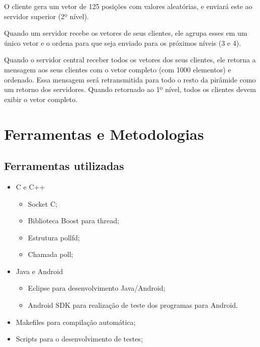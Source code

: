 \documentclass[12pt,a4paper]{article}
\begin{document}
	O cliente gera um vetor de 125 posições com valores aleatórias, e enviará este ao servidor superior (2º nível).

	Quando um servidor recebe os vetores de seus clientes, ele agrupa esses em um único vetor e o ordena para que seja enviado para os próximos níveis (3 e 4).

	Quando o servidor central receber todos os vetores dos seus clientes, ele retorna a mensagem aos seus clientes com o vetor completo (com 1000 elementos) e ordenado. Essa mensagem será retransmitida para todo o resto da pirâmide como um retorno dos servidores. Quando retornado ao 1º nível, todos os clientes devem exibir o vetor completo.

\newpage
\section{Ferramentas e Metodologias}
\subsection{Ferramentas utilizadas}
\begin{itemize}
\item C e C++
	\begin{itemize}
	\item Socket C;
	\item Biblioteca Boost para thread;
	\item Estrutura pollfd;
	\item Chamada poll;
	\end{itemize}
\item Java e Android        
	\begin{itemize}
	\item Eclipse para desenvolvimento Java/Android;
	\item Android SDK para realização de teste dos programas para Android. 
	\end{itemize}
\item Makefiles para compilação automática;
\item Scripts para o desenvolvimento de testes;
\end{itemize}
\end{document}
